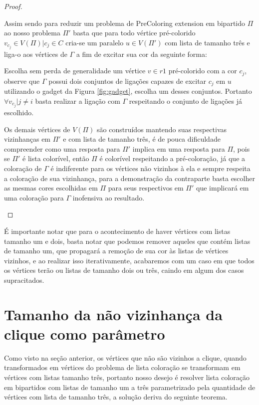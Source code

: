 \begin{proof}
\begin{itemize}
   Assim sendo para reduzir um problema de PreColoring extension em bipartido $\Pi$ ao nosso problema $\Pi'$ basta que para todo vértice pré-colorido $v_{c_j} \in V(\Pi) | c_j \in C$ cria-se um paralelo $u \in V(\Pi')$ com lista de tamanho três e liga-o aos vértices de $\Gamma$ a fim de excitar sua cor da seguinte forma: 
   
   Escolha sem perda de generalidade um vértice $v \in r1$ pré-colorido com a cor $c_j$, observe que $\Gamma$ possui dois conjuntos de ligações capazes de excitar $c_j$ em $u$ utilizando o gadget da Figura \ref{fig:gadget}, escolha um desses conjuntos. Portanto $\forall v_{c_j} | j \neq i$ basta realizar a ligação com $\Gamma$ respeitando o conjunto de ligações já escolhido.
   
    Os demais vértices de $V(\Pi)$ são construídos mantendo suas respectivas vizinhanças em $\Pi'$ e com lista de tamanho três, é de pouca dificuldade compreender como uma resposta para $\Pi'$ implica em uma resposta para $\Pi$, pois se $\Pi'$ é lista colorível, então $\Pi$ é colorível respeitando a pré-coloração, já que a coloração de $\Gamma$ é indiferente para os vértices não vizinhos à ela e sempre respeita a coloração de sua vizinhança, para a demonstração da contraparte basta escolher as mesmas cores escolhidas em $\Pi$ para seus respectivos em $\Pi'$ que implicará em uma coloração para $\Gamma$ inofensiva ao resultado. 
 \end{itemize}
\end{proof}


É importante notar que para o acontecimento de haver vértices com listas tamanho um e dois, basta notar que podemos remover aqueles que contém listas de tamanho um, que propagará a remoção de sua cor às listas de vértices vizinhos, e ao realizar isso iterativamente, acabaremos com um caso em que todos os vértices terão ou listas de tamanho dois ou três, caindo em algum dos casos supracitados.

\section{Tamanho da não vizinhança da clique como parâmetro}

Como visto na seção anterior, os vértices que não são vizinhos a clique, quando transformados em vértices do problema de lista coloração se transformam em vértices com listas tamanho três, portanto nosso desejo é resolver lista coloração em bipartidos com listas de tamanho um a três parametrizado pela quantidade de vértices com lista de tamanho três, a solução deriva do seguinte teorema.

